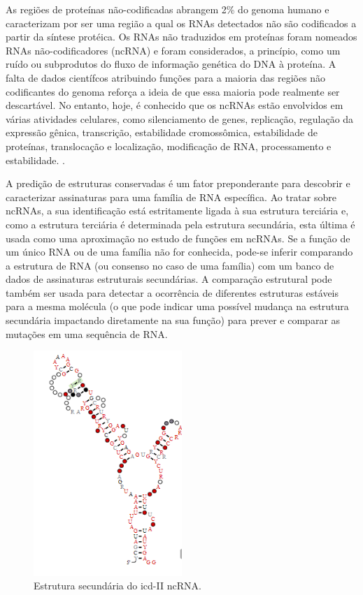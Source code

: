 As regiões de proteínas não-codificadas abrangem 2\% do genoma humano e caracterizam por ser uma região a qual os RNAs detectados não são codificados a partir da síntese protéica. Os RNAs não traduzidos em proteínas foram nomeados RNAs não-codificadores (ncRNA) e foram considerados, a princípio, como um ruído ou subprodutos do fluxo de informação genética do DNA à proteína. A falta de dados científcos atribuindo funções para a maioria das regiões não codificantes do genoma reforça a ideia de que essa maioria pode realmente ser descartável. No entanto, hoje, é conhecido que os ncRNAs estão envolvidos em várias atividades celulares, como silenciamento de genes, replicação, regulação da expressão gênica, transcrição, estabilidade cromossômica, estabilidade de proteínas, translocação e localização, modificação de RNA, processamento e estabilidade. \cite{ncRNAs-intro}.

A predição de estruturas  conservadas é um fator preponderante para descobrir e caracterizar assinaturas para uma família de RNA específica. Ao tratar sobre ncRNAs, a sua identificação está
estritamente ligada à sua estrutura terciária e, como a estrutura terciária é determinada pela estrutura secundária, esta última é usada como uma aproximação no estudo de funções em ncRNAs. Se a função de um único RNA ou de uma família não for conhecida, pode-se inferir comparando a estrutura de RNA (ou consenso no caso de uma família) com um banco de dados de assinaturas estruturais secundárias. A comparação estrutural pode também ser usada para detectar a ocorrência de diferentes estruturas estáveis para a mesma molécula (o que pode indicar uma possível mudança na estrutura secundária impactando diretamente na sua função) para prever e comparar as mutações em uma sequência de RNA. \cite{ncRNAs-mitochondrial}

\begin{figure}[h]
    \centering
    \includegraphics[width=0.5\textwidth]{images/secondary_structure_ncRNA.png}
    \caption{Estrutura secundária do icd-II ncRNA.}
    \label{fig:aminoacidos}
\end{figure}


